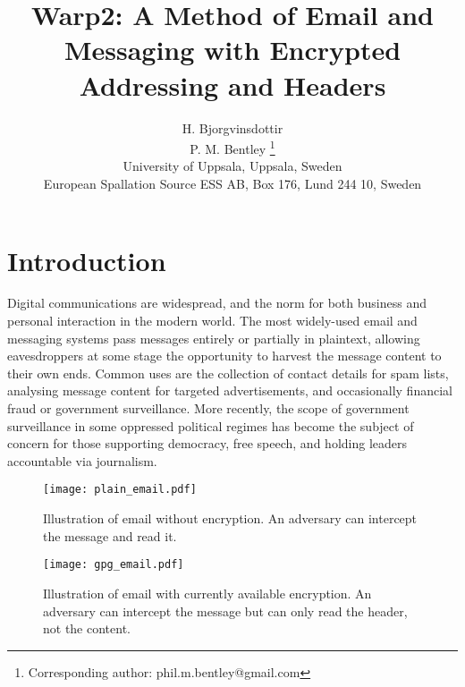 \pdfoutput=1 \documentclass{article}
\title{Warp2: A Method of Email and Messaging with Encrypted Addressing and Headers}
\author{H. Bjorgvinsdottir \\
 P. M. Bentley \thanks{Corresponding author: phil.m.bentley@gmail.com} \\
\small {}University of Uppsala, Uppsala, Sweden\\
\small {}European Spallation Source ESS AB, Box 176, Lund 244 10, Sweden\\
}
\begin{document}
\maketitle




\newpage
\section{Introduction}\label{sec:Introduction}
Digital communications are widespread, and the norm for both business and personal interaction in the modern world.  The most widely-used email and messaging systems pass messages entirely or partially in plaintext, allowing eavesdroppers at some stage the opportunity to harvest the message content to their own ends.  Common uses are the collection of contact details for spam lists, analysing message content for targeted advertisements, and occasionally financial fraud or government surveillance.  More recently, the scope of government surveillance in some oppressed political regimes has become the subject of concern for those supporting democracy, free speech, and holding leaders accountable via journalism.
\begin{figure}[hbt]
\centering
\texttt{[image: plain\_email.pdf]}
\caption{Illustration of email without encryption.  An adversary can intercept the message and read it.}
\label{fig:plainEmail}
\end{figure}
\begin{figure}
\centering
\texttt{[image: gpg\_email.pdf]}
\caption{Illustration of email with currently available encryption.  An adversary can intercept the message but can only read the header, not the content.}
\label{fig:gpgEmail}
\end{figure}
\end{document}
